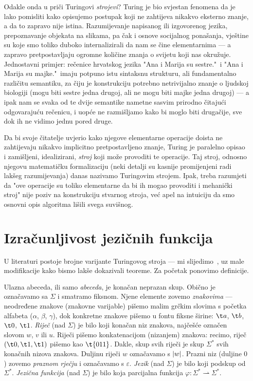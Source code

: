 Odakle onda u priči Turingovi \emph{strojevi}? Turing je bio svjestan fenomena da je lako pomisliti kako opisujemo postupak koji ne zahtijeva nikakvo eksterno znanje, a da to zapravo nije istina. Razumijevanje napisanog ili izgovorenog jezika, prepoznavanje objekata na slikama, pa čak i osnove socijalnog ponašanja, vještine su koje smo toliko duboko internalizirali da nam se čine elementarnima --- a zapravo pretpostavljaju ogromne količine znanja o svijetu koji nas okružuje. Jednostavni primjer: rečenice hrvatskog jezika "Ana i Marija su sestre."\ i "Ana i Marija su majke."\ imaju potpuno istu sintaksnu strukturu, ali fundamentalno različitu semantiku, za čiju je konstrukciju potrebno netrivijalno znanje o ljudskoj biologiji (mogu biti sestre jedna drugoj, ali ne mogu biti majke jedna drugoj) --- a ipak nam se svaka od te dvije semantike nametne sasvim prirodno čitajući odgovarajuću rečenicu, i uopće ne razmišljamo kako bi moglo biti drugačije, sve dok ih ne vidimo jednu pored druge.

Da bi svoje čitatelje uvjerio kako njegove elementarne operacije doista ne zahtijevaju nikakvo implicitno pretpostavljeno znanje, Turing je paralelno opisao i zamišljeni, idealizirani, \emph{stroj} koji može provoditi te operacije. Taj stroj, odnosno njegovu matematičku formalizaciju (neki detalji su kasnije promijenjeni radi lakšeg razumijevanja) danas nazivamo Turingovim strojem. Ipak, treba razumjeti da "ove operacije su toliko elementarne da bi ih mogao provoditi i mehanički stroj" nije poziv na konstrukciju stvarnog stroja, već apel na intuiciju da smo osnovni opis algoritma lišili svega suvišnog.

\section{Izračunljivost jezičnih funkcija}\label{sec:tikp}

U literaturi postoje brojne varijante Turingovog stroja --- mi slijedimo~\cite{sipser}, uz male modifikacije kako bismo lakše dokazivali teoreme. Za početak ponovimo definicije.

Ulazna abeceda, ili samo \emph{abeceda}, je konačan neprazan skup. Obično je označavamo sa $\Sigma$ i smatramo fiksnom. Njene elemente zovemo \emph{znakovima} --- ne\-od\-re\-đe\-ne znakove (znakovne varijable) pišemo malim grčkim slovima s početka alfabeta ($\alpha$, $\beta$, $\gamma$), dok konkretne znakove pišemo u fontu fiksne širine: $\t a$, $\t b$, $\t 0$, $\t 1$. \emph{Riječ} (nad $\Sigma$) je bilo koji konačan niz znakova, najčešće označen slovom $w$, $v$ ili $u$. Riječi pišemo konkatenacijom (nizanjem) znakova: recimo, riječ $(\t0,\t1,\t1)$ pišemo kao $\t{011}$. Dakle, skup svih riječi je skup $\Sigma^*$ svih konačnih nizova znakova. Duljinu riječi $w$ označavamo s $\lvert w\rvert$. Prazni niz (duljine $0$) zovemo \emph{praznom rječju} i označavamo s $\varepsilon$. \emph{Jezik} (nad $\Sigma$) je bilo koji podskup od $\Sigma^*$. \emph{Jezična funkcija} (nad $\Sigma$) je bilo koja parcijalna funkcija $\varphi:\Sigma^*\rightharpoonup\Sigma^*$.

